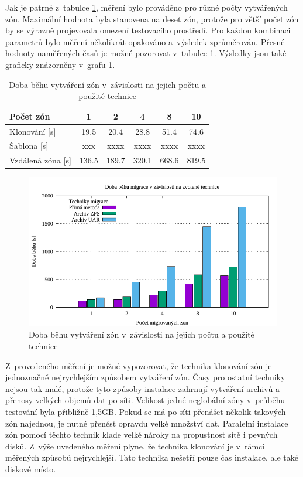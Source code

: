 Jak je patrné z~tabulce \ref{table:measuremet:creation_table}, měření bylo prováděno pro různé počty vytvářených zón. Maximální
hodnota byla stanovena na deset zón, protože pro větší počet zón by se výrazně projevovala omezení testovacího prostředí. Pro každou
kombinaci parametrů bylo měření několikrát opakováno a~výsledek zprůměrován. Přesné hodnoty naměřených časů je možné pozorovat v~tabulce
\ref{table:measuremet:creation_table}. Výsledky jsou také graficky znázorněny v~grafu \ref{graph:measuremet:creation_graph}.
\begin{table}[b]
  \centering
  \caption{Doba běhu vytváření zón v~závislosti na jejich počtu a použité technice}
  \begin{tabular}{ l | c c c c c}
   Počet zón & 1 & 2 & 4 & 8 & 10 \\ \hline
   Klonování [s] & 19.5 & 20.4 & 28.8 & 51.4 & 74.6 \\
   Šablona [s] & xxx & xxxx & xxxx & xxxx & xxxx \\
   Vzdálená zóna [s] & 136.5 & 189.7 & 320.1 & 668.6 & 819.5 \\
  \end{tabular}
  \label{table:measuremet:creation_table}
\end{table}

\begin{figure}
  \centering
  \includegraphics{assets/pdfs/measurement_migration.pdf}
  \caption{Doba běhu vytváření zón v~závislosti na jejich počtu a použité technice}
  \label{graph:measuremet:creation_graph}
\end{figure}

Z~provedeného měření je možné vypozorovat, že technika klonování zón je jednoznačně nejrychlejším způsobem vytváření zón. Časy
pro ostatní techniky nejsou tak malé, protože tyto způsoby instalace zahrnují vytváření archivů a přenosy velkých objemů dat
po síti. Velikost jedné neglobální zóny v~průběhu testování byla přibližně 1,5GB. Pokud se má po síti přenášet několik takových
zón najednou, je nutné přenést opravdu velké množství dat. Paralelní instalace zón pomocí těchto technik klade velké nároky na
propustnost sítě i pevných disků. Z~výše uvedeného měření plyne, že technika klonování je v~rámci měřených způsobů nejrychlejší.
Tato technika nešetří pouze čas instalace, ale také diskové místo.
